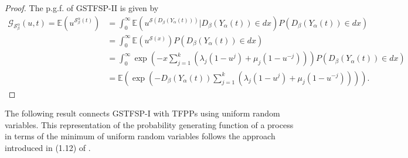\documentclass[11pt,oneside,reqno]{amsart}
\theoremstyle{definition}
\theoremstyle{remarkstyle}
\begin{document}
\begin{proof}
    The p.g.f. of GSTFSP-II is given by
    \begin{align*}
        \mathcal{G}_{\mathcal{S}^{\alpha}_{\beta}}(u,t)=\mathbb{E}(u^{\mathcal{S}^{\alpha}_{\beta}(t)})&=\int_{0}^{\infty}\mathbb{E}(u^{\mathcal{S}(D_\beta(Y_\alpha(t)))}\big|D_\beta(Y_\alpha(t))\in dx)P(D_\beta(Y_\alpha(t))\in dx)\\
        &=\int_{0}^{\infty}\mathbb{E}(u^{\mathcal{S}(x)})P(D_\beta(Y_\alpha(t))\in dx)\\
        &=\int_{0}^{\infty}\exp(-x\sum_{j=1}^{k}(\lambda_j(1-u^j)+\mu_j(1-u^{-j})))P(D_\beta(Y_\alpha(t))\in dx)\\
        &=\mathbb{E}(\exp(-D_\beta(Y_\alpha(t))\sum_{j=1}^{k}(\lambda_j(1-u^j)+\mu_j(1-u^{-j})))).
    \end{align*}
\end{proof}
The following result connects GSTFSP-I with TFPPs using uniform random variables. This representation of the probability generating function of a process in terms of the minimum of uniform random variables follows the approach introduced in (1.12) of \citet{Orsingher2012}.
\end{document}
